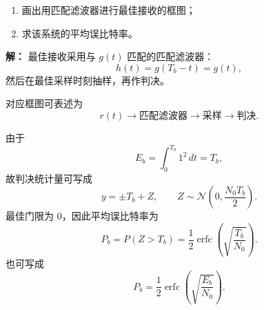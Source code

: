 \begin{enumerate}
\item 画出用匹配滤波器进行最佳接收的框图；
\item 求该系统的平均误比特率。
\end{enumerate}

\par\textbf{解：}
最佳接收采用与 $g(t)$ 匹配的匹配滤波器：
\[
h(t)=g(T_b-t)=g(t),
\]
然后在最佳采样时刻抽样，再作判决。

对应框图可表述为
\[
r(t)\rightarrow \text{匹配滤波器}\rightarrow \text{采样}\rightarrow \text{判决}.
\]

由于
\[
E_b=\int_0^{T_b}1^2\,dt=T_b,
\]
故判决统计量可写成
\[
y=\pm T_b+Z,
\qquad
Z\sim \mathcal{N}\!\left(0,\frac{N_0T_b}{2}\right).
\]
最佳门限为 $0$，因此平均误比特率为
\[
P_b=P(Z>T_b)
=\frac12\operatorname{erfc}\!\left(\sqrt{\frac{T_b}{N_0}}\right).
\]
也可写成
\[
P_b=\frac12\operatorname{erfc}\!\left(\sqrt{\frac{E_b}{N_0}}\right).
\]

\medskip

